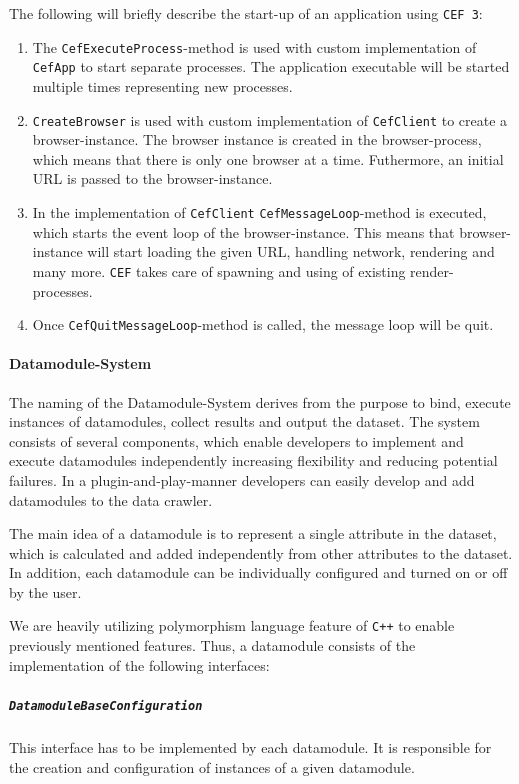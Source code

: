 The following will briefly describe the start-up of an application using \texttt{CEF 3}:
\begin{enumerate}
	\item The \texttt{CefExecuteProcess}-method is used with custom implementation of \texttt{CefApp} to start separate processes. The application executable will be started multiple times representing new processes.
	\item \texttt{CreateBrowser} is used with custom implementation of \texttt{CefClient} to create a browser-instance. The browser instance is created in the browser-process, which means that there is only one browser at a time. Futhermore, an initial URL is passed to the browser-instance.
	\item In the implementation of \texttt{CefClient} \texttt{CefMessageLoop}-method is executed, which starts the event loop of the browser-instance. This means that browser-instance will start loading the given URL, handling network, rendering and many more. \texttt{CEF} takes care of spawning and using of existing render-processes.
	\item Once \texttt{CefQuitMessageLoop}-method is called, the message loop will be quit.
\end{enumerate}

\paragraph*{Datamodule-System}
\label{datacrawler_datamodulesystem}
The naming of the Datamodule-System derives from the purpose to bind, execute instances of datamodules, collect results and output the dataset. The system consists of several components, which enable developers to implement and execute datamodules independently increasing flexibility and reducing potential failures. In a plugin-and-play-manner developers can easily develop and add datamodules to the data crawler.

The main idea of a datamodule is to represent a single attribute in the dataset, which is calculated and added independently from other attributes to the dataset. In addition, each datamodule can be individually configured and turned on or off by the user.

We are heavily utilizing polymorphism language feature of \texttt{C++} to enable previously mentioned features. Thus, a datamodule consists of the implementation of the following interfaces:

\subparagraph*{\texttt{DatamoduleBaseConfiguration}}
	This interface has to be implemented by each datamodule. It is responsible for the creation and configuration of instances of a given datamodule.


